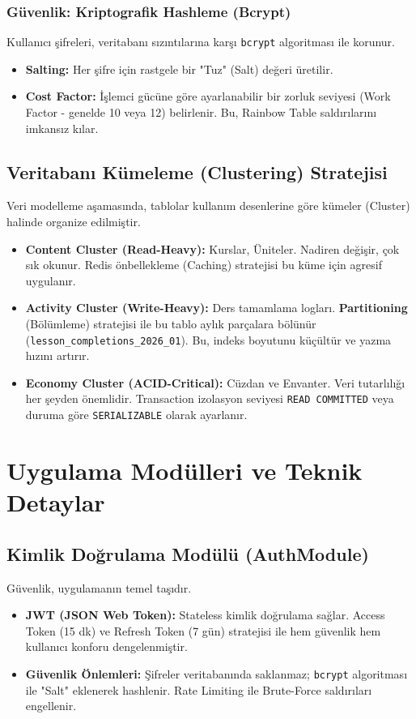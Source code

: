 \documentclass[12pt,a4paper]{report}
\begin{document}
\subsection{Güvenlik: Kriptografik Hashleme (Bcrypt)}
Kullanıcı şifreleri, veritabanı sızıntılarına karşı \texttt{bcrypt} algoritması ile korunur.
\begin{itemize}
    \item \textbf{Salting:} Her şifre için rastgele bir "Tuz" (Salt) değeri üretilir.
    \item \textbf{Cost Factor:} İşlemci gücüne göre ayarlanabilir bir zorluk seviyesi (Work Factor - genelde 10 veya 12) belirlenir. Bu, Rainbow Table saldırılarını imkansız kılar.
\end{itemize}

\section{Veritabanı Kümeleme (Clustering) Stratejisi}
Veri modelleme aşamasında, tablolar kullanım desenlerine göre kümeler (Cluster) halinde organize edilmiştir.

\begin{itemize}
    \item \textbf{Content Cluster (Read-Heavy):} Kurslar, Üniteler. Nadiren değişir, çok sık okunur. Redis önbellekleme (Caching) stratejisi bu küme için agresif uygulanır.
    \item \textbf{Activity Cluster (Write-Heavy):} Ders tamamlama logları. \textbf{Partitioning} (Bölümleme) stratejisi ile bu tablo aylık parçalara bölünür (\texttt{lesson\_completions\_2026\_01}). Bu, indeks boyutunu küçültür ve yazma hızını artırır.
    \item \textbf{Economy Cluster (ACID-Critical):} Cüzdan ve Envanter. Veri tutarlılığı her şeyden önemlidir. Transaction izolasyon seviyesi \texttt{READ COMMITTED} veya duruma göre \texttt{SERIALIZABLE} olarak ayarlanır.
\end{itemize}

\chapter{Uygulama Modülleri ve Teknik Detaylar}

\section{Kimlik Doğrulama Modülü (AuthModule)}
Güvenlik, uygulamanın temel taşıdır.
\begin{itemize}
    \item \textbf{JWT (JSON Web Token):} Stateless kimlik doğrulama sağlar. Access Token (15 dk) ve Refresh Token (7 gün) stratejisi ile hem güvenlik hem kullanıcı konforu dengelenmiştir.
    \item \textbf{Güvenlik Önlemleri:} Şifreler veritabanında saklanmaz; \texttt{bcrypt} algoritması ile "Salt" eklenerek hashlenir. Rate Limiting ile Brute-Force saldırıları engellenir.
\end{itemize}
\end{document}
